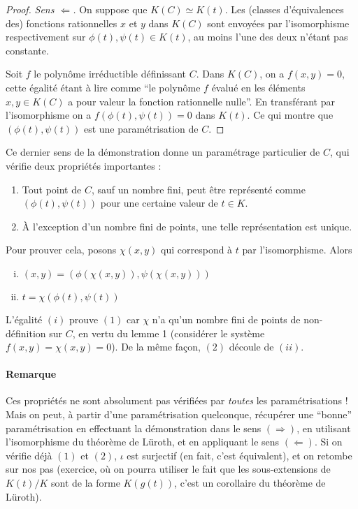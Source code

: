 \documentclass[a4paper, 11pt]{article}
\theoremstyle{definition}
\begin{document}
\begin{proof}
  \textit{Sens $\Leftarrow$.} On suppose que $K(C) \simeq K(t)$. Les
  (classes d'équivalences des) fonctions rationnelles $x$ et $y$ dans
  $K(C)$ sont envoyées par l'isomorphisme respectivement sur
  $\phi(t), \psi(t) \in K(t)$, au moins l'une des deux n'étant pas
  constante.

  Soit $f$ le polynôme irréductible définissant $C$. Dans $K(C)$, on a
  $f(x,y)=0$, cette égalité étant à lire comme \enquote{le polynôme
    $f$ évalué en les éléments $x, y \in K(C)$ a pour valeur la
    fonction rationnelle nulle}. En transférant par l'isomorphisme on
  a $f(\phi(t),\psi(t))=0$ dans $K(t)$. Ce qui montre que
  $(\phi(t), \psi(t))$ est une paramétrisation de $C$.
\end{proof}

Ce dernier sens de la démonstration donne un paramétrage particulier
de $C$, qui vérifie deux propriétés importantes :
\begin{enumerate}[(1)]
\item Tout point de $C$, sauf un nombre fini, peut être représenté
  comme $(\phi(t),\psi(t))$ pour une certaine valeur de $t \in K$.
\item À l'exception d'un nombre fini de points, une telle
  représentation est unique.
\end{enumerate}
Pour prouver cela, posons $\chi(x,y)$ qui correspond à $t$ par
l'isomorphisme. Alors
\begin{enumerate}[(i)]
\item $(x,y) = (\phi(\chi(x,y)), \psi(\chi(x,y)))$
\item $t = \chi(\phi(t),\psi(t))$
\end{enumerate}
L'égalité $(i)$ prouve $(1)$ car $\chi$ n'a qu'un nombre fini de
points de non-définition sur $C$, en vertu du lemme 1 (considérer le
système $f(x,y) = \chi(x,y) = 0$). De la même façon, $(2)$ découle de
$(ii)$.

\paragraph{Remarque} Ces propriétés ne sont absolument pas vérifiées
par \emph{toutes} les paramétrisations ! Mais on peut, à partir d'une
paramétrisation quelconque, récupérer une \enquote{bonne}
paramétrisation en effectuant la démonstration dans le sens
$(\Rightarrow)$, en utilisant l'isomorphisme du théorème de Lüroth, et
en appliquant le sens $(\Leftarrow)$. Si on vérifie déjà $(1)$ et
$(2)$, $\iota$ est surjectif (en fait, c'est équivalent), et on
retombe sur nos pas (exercice, où on pourra utiliser le fait que les
sous-extensions de $K(t)/K$ sont de la forme $K(g(t))$, c'est un
corollaire du théorème de Lüroth).
\end{document}
